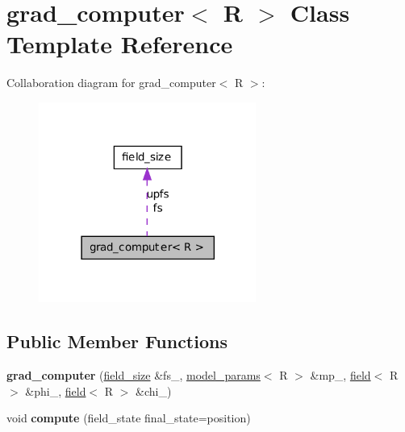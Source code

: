 \hypertarget{classgrad__computer}{
\section{grad\_\-computer$<$ R $>$ Class Template Reference}
\label{classgrad__computer}
}


Collaboration diagram for grad\_\-computer$<$ R $>$:
\nopagebreak
\begin{figure}[H]
\begin{center}
\leavevmode
\includegraphics[width=202pt]{classgrad__computer__coll__graph}
\end{center}
\end{figure}
\subsection*{Public Member Functions}
\begin{DoxyCompactItemize}
\item 
\hypertarget{classgrad__computer_a3ff4765a6bddc2afd7d57ed129345cb6}{
{\bfseries grad\_\-computer} (\hyperlink{structfield__size}{field\_\-size} \&fs\_\-, \hyperlink{structmodel__params}{model\_\-params}$<$ R $>$ \&mp\_\-, \hyperlink{classfield}{field}$<$ R $>$ \&phi\_\-, \hyperlink{classfield}{field}$<$ R $>$ \&chi\_\-)}
\label{classgrad__computer_a3ff4765a6bddc2afd7d57ed129345cb6}

\item 
\hypertarget{classgrad__computer_ab74609eda3c169f231d9292eb49882b0}{
void {\bfseries compute} (field\_\-state final\_\-state=position)}
\label{classgrad__computer_ab74609eda3c169f231d9292eb49882b0}

\end{DoxyCompactItemize}
